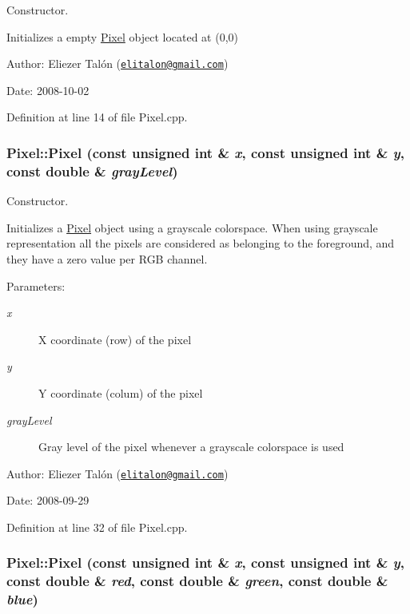Constructor. 

Initializes a empty \hyperlink{class_pixel}{Pixel} object located at (0,0)

\begin{Desc}
\item[Author:]Eliezer Talón (\href{mailto:elitalon@gmail.com}{\tt elitalon@gmail.com}) \end{Desc}
\begin{Desc}
\item[Date:]2008-10-02 \end{Desc}


Definition at line 14 of file Pixel.cpp.\hypertarget{class_pixel_e54d95bf19847e4857eeb03f1138ceb9}{
\subsubsection[Pixel]{\setlength{\rightskip}{0pt plus 5cm}Pixel::Pixel (const unsigned int \& {\em x}, \/  const unsigned int \& {\em y}, \/  const double \& {\em grayLevel})}}
\label{class_pixel_e54d95bf19847e4857eeb03f1138ceb9}


Constructor. 

Initializes a \hyperlink{class_pixel}{Pixel} object using a grayscale colorspace. When using grayscale representation all the pixels are considered as belonging to the foreground, and they have a zero value per RGB channel.

\begin{Desc}
\item[Parameters:]
\begin{description}
\item[{\em x}]X coordinate (row) of the pixel \item[{\em y}]Y coordinate (colum) of the pixel \item[{\em grayLevel}]Gray level of the pixel whenever a grayscale colorspace is used\end{description}
\end{Desc}
\begin{Desc}
\item[Author:]Eliezer Talón (\href{mailto:elitalon@gmail.com}{\tt elitalon@gmail.com}) \end{Desc}
\begin{Desc}
\item[Date:]2008-09-29 \end{Desc}


Definition at line 32 of file Pixel.cpp.\hypertarget{class_pixel_9fb3e8102469e8c2450e64815f5f6fb5}{
\subsubsection[Pixel]{\setlength{\rightskip}{0pt plus 5cm}Pixel::Pixel (const unsigned int \& {\em x}, \/  const unsigned int \& {\em y}, \/  const double \& {\em red}, \/  const double \& {\em green}, \/  const double \& {\em blue})}}
\label{class_pixel_9fb3e8102469e8c2450e64815f5f6fb5}


